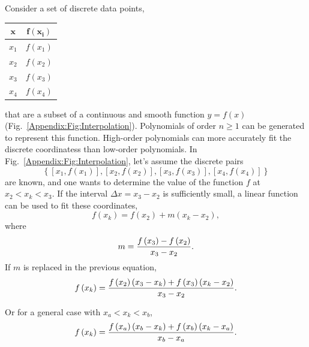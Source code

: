 Consider a set of discrete data points,
  \begin{center}
    \begin{tabular}{c | c }
        $\mathbf{x}$   & $\mathbf{f\left(x_{i}\right)}$ \\
        \hline
           $x_{1}$ &  $f\left(x_{1}\right)$ \\
           $x_{2}$ &  $f\left(x_{2}\right)$ \\
           $x_{3}$ &  $f\left(x_{3}\right)$ \\
           $x_{4}$ &  $f\left(x_{4}\right)$ \\
    \end{tabular}
  \end{center}
that are a subset of a continuous and smooth function $y=f(x)$ (Fig.~\ref{Appendix:Fig:Interpolation}). Polynomials of order $n\ge 1$ can be generated to represent this function. High-order polynomials can more accurately fit the discrete coordinatess than low-order polynomials. In Fig.~\ref{Appendix:Fig:Interpolation}, let's assume the discrete pairs 
  \begin{displaymath}
     \left\{\left[x_{1},f\left(x_{1}\right)\right], \left[x_{2},f\left(x_{2}\right)\right],\left[x_{3},f\left(x_{3}\right)\right], \left[x_{4},f\left(x_{4}\right)\right]\right\}
  \end{displaymath}
are known, and one wants to determine the value of the function $f$ at $x_{2} < x_{k} < x_{3}$. If the interval $\Delta x= x_{3}-x_{2}$ is sufficiently small, a linear function can be used to fit these coordinates,
   \begin{displaymath}
       f\left(x_{k}\right) = f\left(x_{2}\right) + m\left(x_{k}-x_{2}\right),%
   \end{displaymath}
where 
   \begin{displaymath}
      m = \displaystyle\frac{f\left(x_{3}\right)-f\left(x_{2}\right)}{x_{3}-x_{2}}.
   \end{displaymath}
If $m$ is replaced in the previous equation, %
   \begin{displaymath}
       f\left(x_{k}\right) = \displaystyle\frac{f\left(x_{2}\right)\left(x_{3}-x_{k}\right) + f\left(x_{3}\right)\left(x_{k}-x_{2}\right)}{x_{3}-x_{2}}.
   \end{displaymath}
   
   \begin{shaded}
      Or for a general case with $x_{a} < x_{k} < x_{b}$,
        \begin{equation}\label{LinearInterpolation:Eqn1}
            f\left(x_{k}\right) = \displaystyle\frac{f\left(x_{a}\right)\left(x_{b}-x_{k}\right) + f\left(x_{b}\right)\left(x_{k}-x_{a}\right)}{x_{b}-x_{a}}.
        \end{equation}
   \end{shaded}

